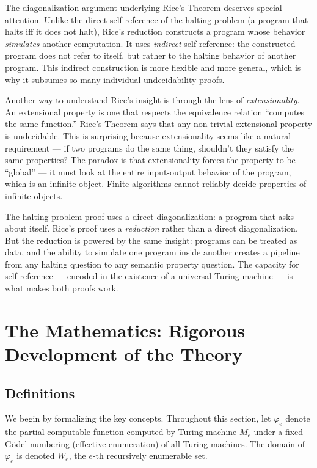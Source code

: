 The diagonalization argument underlying Rice's Theorem deserves special attention. Unlike the direct self-reference of the halting problem (a program that halts iff it does not halt), Rice's reduction constructs a program whose behavior \emph{simulates} another computation. It uses \emph{indirect} self-reference: the constructed program does not refer to itself, but rather to the halting behavior of another program. This indirect construction is more flexible and more general, which is why it subsumes so many individual undecidability proofs.

Another way to understand Rice's insight is through the lens of \emph{extensionality}. An extensional property is one that respects the equivalence relation ``computes the same function.'' Rice's Theorem says that any non-trivial extensional property is undecidable. This is surprising because extensionality seems like a natural requirement --- if two programs do the same thing, shouldn't they satisfy the same properties? The paradox is that extensionality forces the property to be ``global'' --- it must look at the entire input-output behavior of the program, which is an infinite object. Finite algorithms cannot reliably decide properties of infinite objects.

The halting problem proof uses a direct diagonalization: a program that asks about itself. Rice's proof uses a \emph{reduction} rather than a direct diagonalization. But the reduction is powered by the same insight: programs can be treated as data, and the ability to simulate one program inside another creates a pipeline from any halting question to any semantic property question. The capacity for self-reference --- encoded in the existence of a universal Turing machine --- is what makes both proofs work.

\section{The Mathematics: Rigorous Development of the Theory}
\label{sec:rice:math}

\subsection{Definitions}
\label{sec:rice:definitions}

We begin by formalizing the key concepts. Throughout this section, let $\varphi_e$ denote the partial computable function computed by Turing machine $M_e$ under a fixed G\"odel numbering (effective enumeration) of all Turing machines. The domain of $\varphi_e$ is denoted $W_e$, the $e$-th recursively enumerable set.

